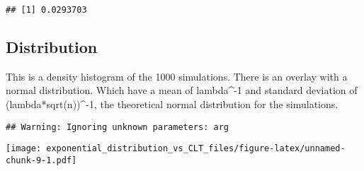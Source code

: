 \documentclass[]{article}
\newenvironment{Shaded}{\begin{snugshade}}{\end{snugshade}}
\newcommand{\KeywordTok}[1]{\textcolor[rgb]{0.13,0.29,0.53}{\textbf{{#1}}}}
\newcommand{\DataTypeTok}[1]{\textcolor[rgb]{0.13,0.29,0.53}{{#1}}}
\newcommand{\DecValTok}[1]{\textcolor[rgb]{0.00,0.00,0.81}{{#1}}}
\newcommand{\FloatTok}[1]{\textcolor[rgb]{0.00,0.00,0.81}{{#1}}}
\newcommand{\StringTok}[1]{\textcolor[rgb]{0.31,0.60,0.02}{{#1}}}
\newcommand{\NormalTok}[1]{{#1}}
\begin{document}
\begin{verbatim}
## [1] 0.0293703
\end{verbatim}

\subsection{Distribution}\label{distribution}

This is a density histogram of the 1000 simulations. There is an overlay
with a normal distribution. Which have a mean of lambda\^{}-1 and
standard deviation of (lambda*sqrt(n))\^{}-1, the theoretical normal
distribution for the simulations.

\begin{Shaded}
\end{Shaded}

\begin{verbatim}
## Warning: Ignoring unknown parameters: arg
\end{verbatim}

\texttt{[image: exponential\_distribution\_vs\_CLT\_files/figure-latex/unnamed-chunk-9-1.pdf]}
\end{document}
